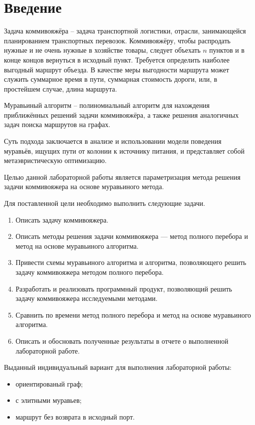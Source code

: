 \chapter*{Введение}

Задача коммивояжёра – задача транспортной логистики, отрасли, занимающейся планированием транспортных перевозок.
Коммивояжёру, чтобы распродать нужные и не очень нужные в хозяйстве товары, следует объехать $n$ пунктов и в конце концов вернуться в исходный пункт.
Требуется определить наиболее выгодный маршрут объезда. В качестве меры выгодности маршрута может служить суммарное время в пути, суммарная стоимость дороги, или, в простейшем случае, длина маршрута.

Муравьиный алгоритм – полиномиальный алгоритм для нахождения приближённых решений задачи коммивояжёра, а также решения аналогичных задач поиска маршрутов на графах.

Суть подхода заключается в анализе и использовании модели поведения муравьёв, ищущих пути от колонии к источнику питания, и представляет собой метаэвристическую оптимизацию.

Целью данной лабораторной работы является параметризация метода решения задачи коммивояжера на основе муравьиного метода.

Для поставленной цели необходимо выполнить следующие задачи.
\begin{enumerate}
	\item Описать задачу коммивояжера.
	\item Описать методы решения задачи коммивояжера --- метод полного перебора и метод на основе муравьиного алгоритма.
	\item Привести схемы муравьиного алгоритма и алгоритма, позволяющего решить задачу коммивояжера методом полного перебора.
	\item Разработать и реализовать программный продукт, позволяющий решить задачу коммивояжера исследуемыми методами.
	\item Сравнить по времени метод полного перебора и метод на основе муравьиного алгоритма.
	\item Описать и обосновать полученные результаты в отчете о выполненной лабораторной работе.
\end{enumerate}

Выданный индивидуальный вариант для выполнения лабораторной работы:
\begin{itemize}
	\item ориентированый граф;
	\item с элитными муравьев;
	\item маршрут без возврата в исходный порт.
\end{itemize}
